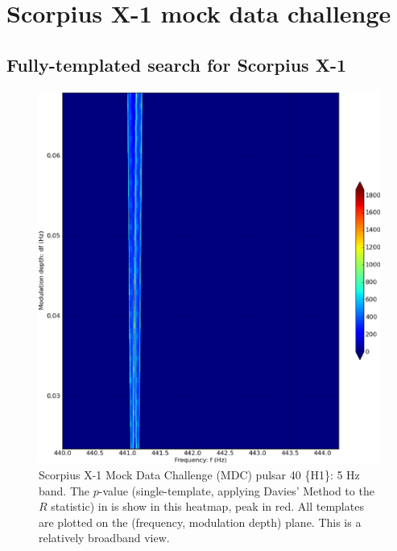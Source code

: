

\section{Scorpius X-1 mock data challenge}
\subsection{Fully-templated search for Scorpius X-1}


\begin{figure}
\begin{center}
\includegraphics[width=0.8\paperwidth,height=0.62\paperheight]{bandH1-bold.eps}


\caption{
Scorpius X-1 Mock Data Challenge (MDC) pulsar 40 \{H1\}: 5 Hz band. 
The $p$-value (single-template, applying Davies' Method to the $R$ statistic) in is show in this heatmap, peak in red. 
All templates are plotted on the (frequency, modulation depth) plane.
This is a relatively broadband view.
}
\end{center}
\end{figure}


